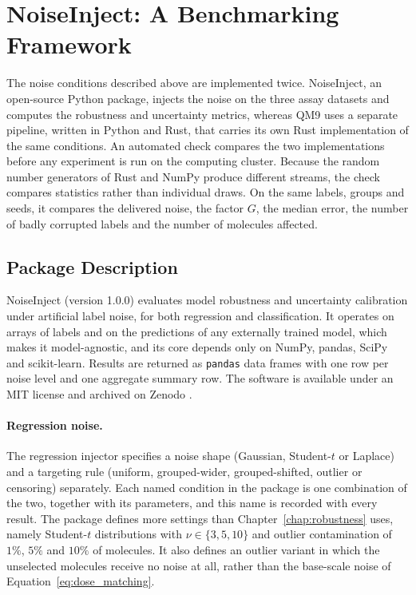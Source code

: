 \section{NoiseInject: A Benchmarking Framework}

The noise conditions described above are implemented twice. NoiseInject, an open-source Python package, injects the noise on the three assay datasets and computes the robustness and uncertainty metrics, whereas QM9 uses a separate
pipeline, written in Python and Rust, that carries its own Rust implementation of the same conditions.
An automated check compares the two implementations before any experiment is run on the computing cluster. Because the random number generators of Rust and
NumPy produce different streams, the check compares statistics rather
than individual draws. On the same labels, groups and seeds, it compares the delivered noise, the
factor $G$, the median error, the number of badly corrupted labels and the number of molecules
affected.

\subsection{Package Description}\label{sec:noiseinject_pkg} %

NoiseInject (version 1.0.0) evaluates model robustness and uncertainty calibration under artificial
label noise, for both regression and classification. It operates on arrays of labels and on the
predictions of any externally trained model, which makes it model-agnostic, and its core depends only
on NumPy, pandas, SciPy and scikit-learn. Results are returned as \texttt{pandas} data frames with one
row per noise level and one aggregate summary row. The software is available under an MIT license
and archived on Zenodo \citep{noiseinject}.

\paragraph{Regression noise.} The regression injector specifies a noise shape (Gaussian, Student-$t$ or
Laplace) and a targeting rule (uniform, grouped-wider, grouped-shifted, outlier or censoring)
separately. Each named condition in the package is one combination of the two, together with its
parameters, and this name is recorded with every result. The package defines more settings
than Chapter~\ref{chap:robustness} uses, namely Student-$t$ distributions with $\nu \in \{3, 5, 10\}$ and outlier contamination of $1\%$,
$5\%$ and $10\%$ of molecules. It also defines an outlier variant in which the unselected molecules receive no
noise at all, rather than the base-scale noise of Equation~\ref{eq:dose_matching}.

